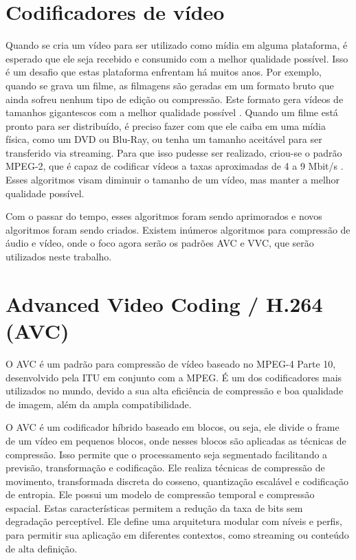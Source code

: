 \section{Codificadores de vídeo}%

Quando se cria um vídeo para ser utilizado como mídia em alguma plataforma, é esperado
que ele seja recebido e consumido com a melhor qualidade possível. Isso é um desafio
que estas plataforma enfrentam há muitos anos. Por exemplo, quando se grava um filme,
as filmagens são geradas em um formato bruto que ainda sofreu nenhum tipo de edição
ou compressão. Este formato gera vídeos de tamanhos gigantescos com a melhor qualidade
possível \cite{what_is_raw_footage}. Quando um filme está pronto para ser distribuído,
é preciso fazer com que ele caiba em uma mídia física, como um DVD ou Blu-Ray, ou tenha
um tamanho aceitável para ser transferido via streaming. Para que isso pudesse ser
realizado, criou-se o padrão MPEG-2, que é capaz de codificar vídeos a taxas aproximadas
de 4 a 9 Mbit/s \cite{mpeg2}. Esses algoritmos visam diminuir o tamanho de um vídeo,
mas manter a melhor qualidade possível.

Com o passar do tempo, esses algoritmos foram sendo aprimorados e novos algoritmos
foram sendo criados. Existem inúmeros algoritmos para compressão de áudio e vídeo,
onde o foco agora serão os padrões \acrfull{AVC} e \acrfull{VVC}, que serão utilizados
neste trabalho.

\section{Advanced Video Coding / H.264 (AVC)}

O \acrshort{AVC} é um padrão para compressão de vídeo baseado no MPEG-4 Parte 10,
desenvolvido pela \acrfull{ITU} em conjunto com a \acrshort{MPEG}. É um dos
codificadores mais utilizados no mundo, devido a sua alta eficiência de compressão
e boa qualidade de imagem, além da ampla compatibilidade.

O \acrshort{AVC} é um codificador híbrido baseado em blocos, ou seja, ele divide
o frame de um vídeo em pequenos blocos, onde nesses blocos são aplicadas as técnicas de
compressão. Isso permite que o processamento seja segmentado facilitando a previsão,
transformação e codificação. Ele realiza técnicas de compressão de movimento, transformada discreta do 
cosseno, quantização escalável e codificação de entropia. Ele possui um modelo de 
compressão temporal e compressão espacial. Estas características permitem a redução 
da taxa de bits sem degradação perceptível. Ele define uma arquitetura modular com 
níveis e perfis, para permitir sua aplicação em diferentes contextos, como streaming 
ou conteúdo de alta definição.

